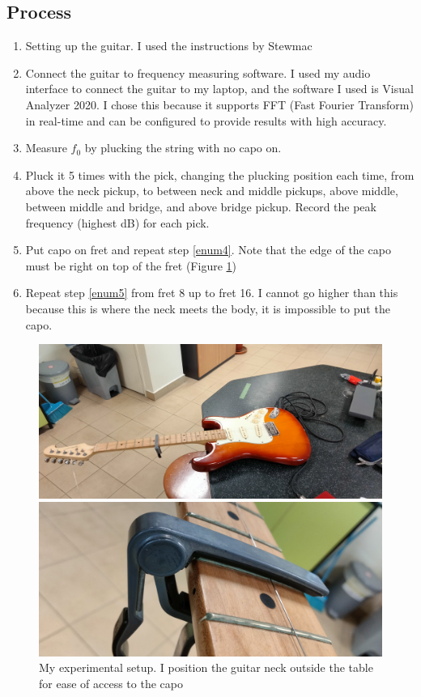 \documentclass[11pt]{article}
\begin{document}
\begin{flushleft}
        \subsection{Process}
            \begin{enumerate}
                \item Setting up the guitar. I used the instructions by Stewmac %
                \item Connect the guitar to frequency measuring software. I used my audio interface to connect the guitar to my laptop, and the software I used is Visual Analyzer 2020. I chose this because it supports FFT (Fast Fourier Transform) in real-time and can be configured to provide results with high accuracy. 
                \item Measure $f_0$ by plucking the string with no capo on.
                \item Pluck it 5 times with the pick, changing the plucking position each time, from above the neck pickup, to between neck and middle pickups, above middle, between middle and bridge, and above bridge pickup. Record the peak frequency (highest dB) for each pick. \label{enum4}
                \item Put capo on  fret and repeat step \ref{enum4}. Note that the edge of the capo must be right on top of the fret (Figure \ref{fig5})\label{enum5}
                \item Repeat step \ref{enum5} from fret 8 up to fret 16. I cannot go higher than this because this is where the neck meets the body, it is impossible to put the capo.
            \end{enumerate}
            \begin{figure}
                \includegraphics[width = \textwidth]{ee/experiment_setup.jpg}
                \caption{My experimental setup. I position the guitar neck outside the table for ease of access to the capo} \label{fig5}
                \includegraphics[angle=270, width = \textwidth]{ee/capo_on_fret.jpg}

\end{figure}
\end{flushleft}
\end{document}
